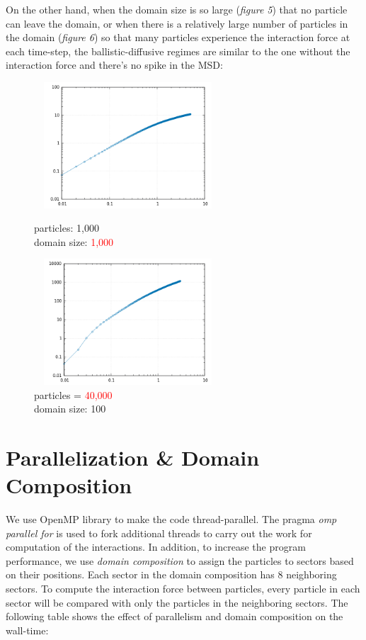 \documentclass[a4paper,11pt]{article}
\begin{document}
\noindent On the other hand, when the domain size is so large (\emph{figure 5}) that no particle can leave the domain, or when there is a relatively large number of particles in the domain (\emph{figure 6}) so that many particles experience the interaction force at each time-step, the ballistic-diffusive regimes are similar to the one without the interaction force and there's no spike in the MSD:
\begin{figure}[!htb]
    \centering
    \begin{minipage}{.5\textwidth}
      \centering
      \includegraphics[width=7cm, height=4.7cm]{rms_n1000_l1000.png}
      \caption{\small particles: 1,000 \\ domain size: \textcolor{red}{1,000}}
    \end{minipage}%
    \begin{minipage}{.5\textwidth}
      \centering
      \includegraphics[width=7cm, height=4.7cm]{rms_n4000_l100.png}
      \caption{\small particles = \textcolor{red}{40,000} \\ domain size: 100}
    \end{minipage}
\end{figure}

\newpage

\section*{Parallelization \& Domain Composition}
We use OpenMP \cite{omp} library to make the code thread-parallel. The pragma \emph{omp parallel for} is used to fork additional threads to carry out the work for computation of the interactions. In addition, to increase the program performance, we use \emph{domain composition} to assign the particles to sectors based on their positions. Each sector in the domain composition has 8 neighboring sectors. To compute the interaction force between particles, every particle in each sector will be compared with only the particles in the neighboring sectors. The following table shows the effect of parallelism and domain composition on the wall-time:
\end{document}
